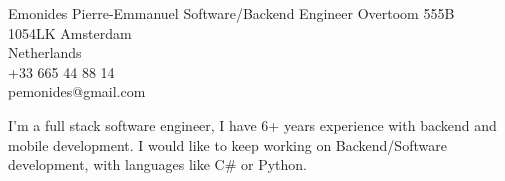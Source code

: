 \documentclass{emonides-cv}
\begin{document}
  {Emonides} {Pierre-Emmanuel}
  {Software/Backend Engineer}
  { Overtoom 555B\\
    1054LK Amsterdam\\
    Netherlands\\
    +33 665 44 88 14\\
    pemonides@gmail.com\\
    }

I'm a full stack software engineer, I have 6+ years experience with backend and mobile development. I would like to keep working on Backend/Software development, with languages like C\# or Python.
\end{document}
